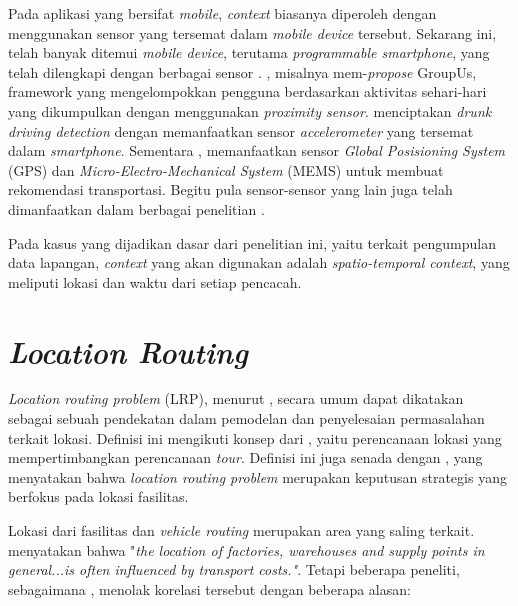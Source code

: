Pada aplikasi yang bersifat \textit{mobile}, \textit{context} biasanya diperoleh dengan menggunakan sensor yang tersemat dalam \textit{mobile device} tersebut. Sekarang ini, telah banyak ditemui \textit{mobile device}, terutama \textit{programmable smartphone}, yang telah dilengkapi dengan berbagai sensor \citep{cao_mobile_2015}. \citep{do_groupus:_2011}, misalnya mem-\textit{propose} GroupUs, framework yang mengelompokkan pengguna berdasarkan aktivitas sehari-hari yang dikumpulkan dengan menggunakan \textit{proximity sensor}. \citep{dai_mobile_2010} menciptakan \textit{drunk driving detection} dengan memanfaatkan sensor \textit{accelerometer} yang tersemat dalam \textit{smartphone}. Sementara \citep{zou_context-aware_2016}, memanfaatkan sensor \textit{Global Posisioning System} (GPS) dan \textit{Micro-Electro-Mechanical System} (MEMS) untuk membuat rekomendasi transportasi. Begitu pula sensor-sensor yang lain juga telah dimanfaatkan dalam berbagai penelitian \citep{dai_perfalld:_2010, lu_soundsense:_2009, bao_movi:_2010, rubel_toward_2005, atzmueller_towards_2013}.


Pada kasus yang dijadikan dasar dari penelitian ini, yaitu terkait pengumpulan data lapangan, \textit{context} yang akan digunakan adalah \textit{spatio-temporal context}, yang meliputi lokasi dan waktu dari setiap pencacah.


\section{\textit{Location Routing}}
\label{sec:location-routing}
\textit{Location routing problem} (LRP), menurut \citep{nagy_location-routing:_2007}, secara umum dapat dikatakan sebagai sebuah pendekatan dalam pemodelan dan penyelesaian permasalahan terkait lokasi. Definisi ini mengikuti konsep dari \citep{bruns_zweistufige_1998}, yaitu perencanaan lokasi yang mempertimbangkan perencanaan \textit{tour}. Definisi ini juga senada dengan \citep{balakrishnan_integrated_1987}, yang menyatakan bahwa \textit{location routing problem} merupakan keputusan strategis yang berfokus pada lokasi fasilitas.


Lokasi dari fasilitas dan \textit{vehicle routing} merupakan area yang saling terkait. \citep{maranzana_location_1964} menyatakan bahwa "\textit{the location of factories, warehouses and supply points in general...is often influenced by transport costs."}. Tetapi beberapa peneliti, sebagaimana \citep{nagy_location-routing:_2007}, menolak korelasi tersebut dengan beberapa alasan:

